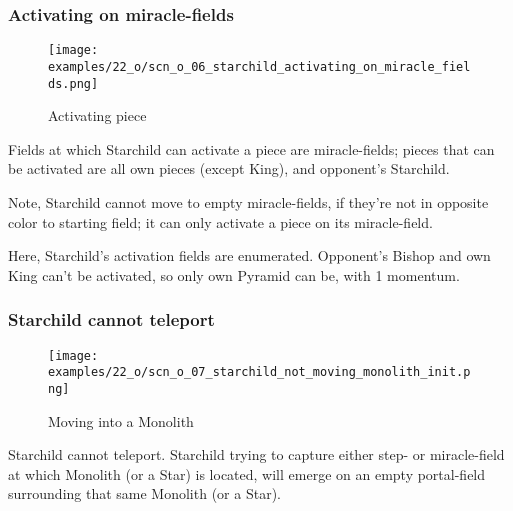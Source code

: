 \vspace*{2.1\baselineskip}
\subsubsection*{Activating on miracle-fields}
\label{sec:One/Starchild/Movement/Activating on miracle-fields}

\noindent
\begin{wrapfigure}[8]{l}{0.4\textwidth}
\centering
\texttt{[image: examples/22\_o/scn\_o\_06\_starchild\_activating\_on\_miracle\_fields.png]}
\caption{Activating piece}
\label{fig:scn_o_06_starchild_activating_on_miracle_fields}
\end{wrapfigure}
Fields at which Starchild can activate a piece are miracle-fields; pieces that
can be activated are all own pieces (except King), and opponent's Starchild.

Note, Starchild cannot move to empty miracle-fields, if they're not in opposite
color to starting field; it can only activate a piece on its miracle-field.

Here, Starchild's activation fields are enumerated. Opponent's Bishop and own King
can't be activated, so only own Pyramid can be, with 1 momentum.

\clearpage %

\subsubsection*{Starchild cannot teleport}
\label{sec:One/Starchild/Movement/Starchild cannot teleport}

\noindent
\begin{wrapfigure}[6]{l}{0.4\textwidth}
\centering
\texttt{[image: examples/22\_o/scn\_o\_07\_starchild\_not\_moving\_monolith\_init.png]}
\caption{Moving into a Monolith}
\label{fig:scn_o_07_starchild_not_moving_monolith_init}
\end{wrapfigure}
Starchild cannot teleport. Starchild trying to capture either step- or miracle-field
at which Monolith (or a Star) is located, will emerge on an empty portal-field
surrounding that same Monolith (or a Star).

